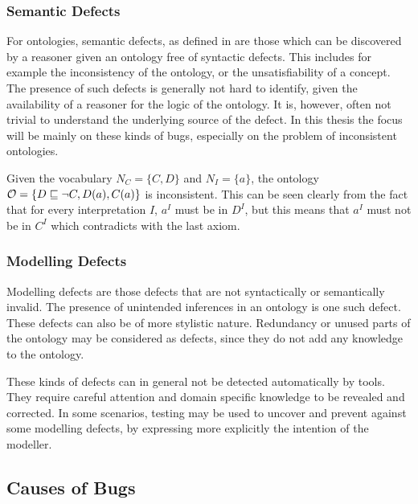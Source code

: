 \subsubsection{Semantic Defects} \label{semantic-defects}

For ontologies, semantic defects, as defined in \cite{kalyanpur2005debugging}  are those which can be discovered by a reasoner given an ontology free of syntactic defects. This includes for example the inconsistency of the ontology, or the unsatisfiability of a concept. The presence of such defects is generally not hard to identify, given the availability of a reasoner for the logic of the ontology. It is, however, often not trivial to understand the underlying source of the defect. In this thesis the focus will be mainly on these kinds of bugs, especially on the problem of inconsistent ontologies.

\begin{example}
  Given the vocabulary $N_C = \{ C, D \}$ and $N_I = \{ a \}$, the \SROIQ ontology $\mathcal{O} = \{ D \sqsubseteq \lnot C, D(a), C(a) \}$ is inconsistent. This can be seen clearly from the fact that for every interpretation $I$, $a^I$ must be in $D^I$, but this means that $a^I$ must not be in $C^I$ which contradicts with the last axiom.
\end{example}

\subsubsection{Modelling Defects} \label{modelling-defects}

Modelling defects are those defects that are not syntactically or semantically invalid. The presence of unintended inferences in an ontology is one such defect. These defects can also be of more stylistic nature. Redundancy or unused parts of the ontology may be considered as defects, since they do not add any knowledge to the ontology.

These kinds of defects can in general not be detected automatically by tools. They require careful attention and domain specific knowledge to be revealed and corrected. In some scenarios, testing may be used to uncover and prevent against some modelling defects, by expressing more explicitly the intention of the modeller.

\subsection{Causes of Bugs} \label{causes-of-bugs}

